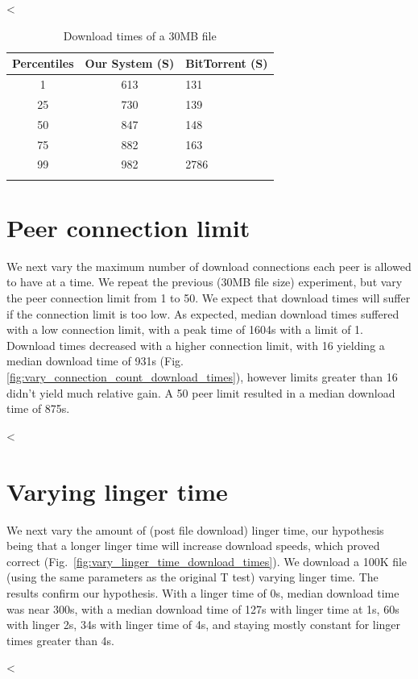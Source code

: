 <%

\begin{table}
  \caption{Download times of a 30MB file}
\begin{tabular}{ c c l }
  Percentiles & Our System (S) & BitTorrent (S) \\
  \hline
  1 & 613 & 131 \\
  25 & 730 & 139 \\
  50 & 847 & 148 \\
  75 & 882 & 163 \\
  99 & 982 & 2786 \\
  \label{fig:yanc_vs_bt}
\end{tabular}
\end{table}
  
\section{Peer connection limit} 

We next vary the maximum number of download connections each peer is allowed to have at a time. We 
repeat the previous (30MB file size) experiment, but vary the peer connection limit from 1 to 50. 
We expect that download times will suffer if the connection limit is too low. As expected, median 
download times suffered with a low connection limit, with a peak time of 1604s with a limit of 1. Download 
times decreased with a higher connection limit, with 16 yielding a median download time of 931s 
(Fig. \ref{fig:vary_connection_count_download_times}), however limits greater than 16 didn't 
yield much relative gain. A 50 peer limit resulted in a median download time of 875s.

<%

\section{Varying linger time}

We next vary the amount of (post file download) linger time, our hypothesis being that a longer linger 
time will increase download speeds, which proved correct (Fig.~\ref{fig:vary_linger_time_download_times}). 
We download a 100K file (using the same parameters as the original T test) varying linger time. The 
results confirm our hypothesis. With a linger time of 0s, median download time was near 300s, with 
a median download time of 127s with linger time at 1s, 60s with linger 2s, 34s with linger time of 4s, 
and staying mostly constant for linger times greater than 4s.

<%
